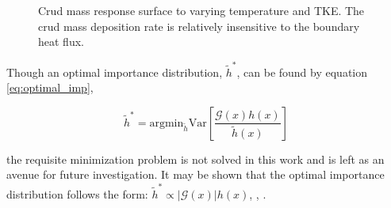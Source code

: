 \begin{figure}[H]%
    \centering
    \hspace*{-1.0em}%
    \caption[Crud mass response surface to varying temperature and TKE.]{Crud mass response surface to varying temperature and TKE. The crud mass deposition rate is relatively insensitive to the boundary heat flux.}%
    \label{fig:crud_sensi3}%
\end{figure}

Though an optimal importance distribution, $\tilde{h}^* $, can be found by equation \ref{eq:optimal_imp},

\begin{equation}
\tilde{h}^* = \mathrm{argmin}_{\tilde{h}}\mathrm{Var} \left[ \frac{\mathcal{G}(x)h(x)}{\tilde{h}(x)} \right] 
\label{eq:optimal_imp}
\end{equation}

the requisite minimization problem is not solved in this work and is left as an avenue for future investigation. It may be shown that the optimal importance distribution follows the form: $\tilde{h}^* \propto |\mathcal{G}(x)|h(x)$, \cite{rubinstein2011}, \cite{mcbook}.

